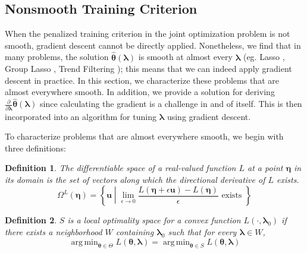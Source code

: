 \documentclass[12pt]{article}
\newtheorem{definition}{Definition}
\DeclareMathOperator*{\argmin}{arg\,min}
\begin{document}
\subsection{Nonsmooth Training Criterion}
When the penalized training criterion in the joint optimization problem is not smooth, gradient descent cannot be directly applied. Nonetheless, we find that in many problems, the solution $\hat{\boldsymbol \theta}\left(\boldsymbol{\lambda}\right)$ is smooth at almost every $\boldsymbol{\lambda}$ (eg. Lasso \citep{tibshirani1996regression}, Group Lasso \citep{yuan2006model}, Trend Filtering \citep{kim2009ell_1}); this means that we can indeed apply gradient descent in practice. In this section, we characterize these problems that are almost everywhere smooth. In addition, we provide a solution for deriving $\frac{\partial}{\partial \boldsymbol{\lambda}} \hat{\boldsymbol \theta}(\boldsymbol{\lambda})$ since calculating the gradient is a challenge in and of itself. This is then incorporated into an algorithm for tuning $\boldsymbol{\lambda}$ using gradient descent.

To characterize problems that are almost everywhere smooth, we begin with three definitions:
\begin{definition}
The differentiable space of a real-valued function $L$ at a point $\boldsymbol \eta$ in its domain is the set of vectors along which the directional derivative of $L$ exists.
\begin{equation}
\Omega^{L}(\boldsymbol \eta) = \left \{ \boldsymbol u \middle | \lim_{\epsilon \rightarrow 0} \frac{L(\boldsymbol \eta + \epsilon \boldsymbol u) - L(\boldsymbol \eta)}{\epsilon} \text{ exists } \right \}
\end{equation}
\end{definition}

\begin{definition}
$S$ is a local optimality space for a convex function $L(\cdot, \boldsymbol \lambda_0)$ if there exists a neighborhood $W$ containing $\boldsymbol \lambda_0$ such that for every $\boldsymbol \lambda \in W$,
\begin{equation}
\argmin_{\boldsymbol \theta \in \Theta} L(\boldsymbol \theta, \boldsymbol \lambda) =
\argmin_{\boldsymbol \theta \in S} L(\boldsymbol \theta, \boldsymbol \lambda)
\end{equation}
\end{definition}
\end{document}
